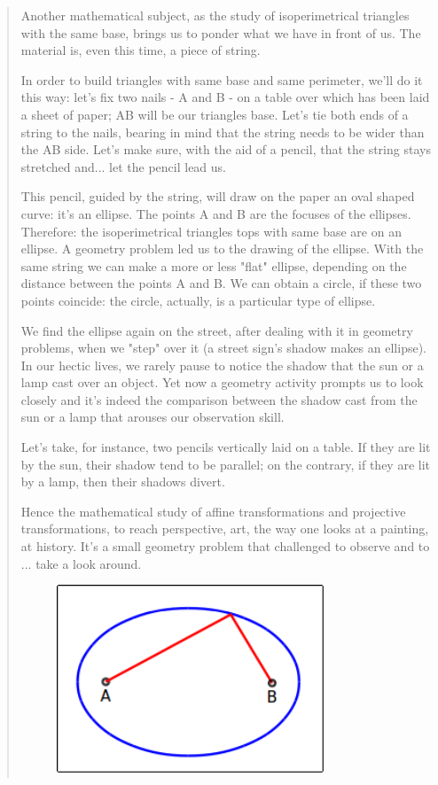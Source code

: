 \begin{quote}
Another mathematical subject, as the study of isoperimetrical triangles with the same base, brings us to ponder what we have in front of us.
The material is, even this time, a piece of string. 

In order to build triangles with same base and same perimeter, we'll do it this way: let's fix two nails - A and B - on a table over which has been laid a sheet of paper; AB will be our triangles base. Let's tie both ends of a string to the nails, bearing in mind that the string needs to be wider than the AB side. Let's make sure, with the aid of a pencil, that the string stays stretched and... let the pencil lead us.

This pencil, guided by the string, will draw on the paper an oval shaped curve: it's an ellipse. The points A and B are the focuses of the ellipses. Therefore: the isoperimetrical triangles tops with same base are on an ellipse.
A geometry problem led us to the drawing of the ellipse. With the same string we can make a more or less "flat" ellipse, depending on the distance between the points A and B. We can obtain a circle, if these two points coincide: the circle, actually, is a particular type of ellipse.
  
We find the ellipse again on the street, after dealing with it in geometry problems, when we "step" over it (a street sign's shadow makes an ellipse). In our hectic lives, we rarely pause to notice the shadow that the sun or a lamp cast over an object. Yet now a geometry activity prompts us to look closely and it's indeed the comparison between the shadow cast from the sun or a lamp that arouses our observation skill.

Let's take, for instance, two pencils vertically laid on a table. If they are lit by the sun, their shadow tend to be parallel; on the contrary, if they are lit by a lamp, then their shadows divert.

Hence the mathematical study of affine transformations and projective transformations, to reach perspective, art, the way one looks at a painting, at history.
It's a small geometry problem that challenged to observe and to ... take a look around.


\vskip 1cm

\begin{figure}[H]
   \centering
   \includegraphics[width=8.0cm,trim=4 4 8 4,clip]{./images/disegnare/disegnare-23.png}
   \label{dis-22}
\end{figure}

\vskip 1cm

\end{quote}

